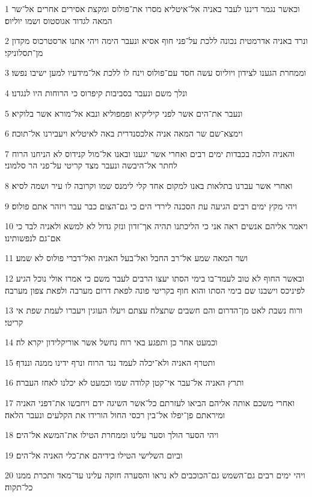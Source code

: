 \par 1 וכאשר נגמר דיננו לעבר באניה אל־איטליא מסרו את־פולוס ומקצת אסירים אחרים אל־שר המאה לגדוד אגוסטוס ושמו יוליוס׃
\par 2 ונרד באניה אדרמטית נכונה ללכת על־פני חוף אסיא ונעבר הימה ויהי אתנו ארסטרכוס מקדון מן־תסלוניקי׃
\par 3 וממחרת הגענו לצידון ויוליוס עשה חסד עם־פולוס וינח לו ללכת אל־מידעיו למען ישיבו נפשו׃
\par 4 ונלך משם ונעבר בסביבות קיפרוס כי הרוחות היו לנגדנו׃
\par 5 ונעבר את־הים אשר לפני קיליקיא ופמפוליא ונבא אל־מורא אשר בלוקיא׃
\par 6 וימצא־שם שר המאה אניה אלכסנדרית באה לאיטליא ויעבירנו אל־תוכה׃
\par 7 והאניה הלכה בכבדות ימים רבים ואחרי אשר יגענו ובאנו אל־מול קנידוס לא הניחנו הרוח לחתר אל־היבשה ונעבר מצד קריטי על־פני הר סלמוני׃
\par 8 ואחרי אשר עברנו בתלאות באנו למקום אחד קלי לימנס שמו וקרובה לו עיר ושמה לסיא׃
\par 9 ויהי מקץ ימים רבים הגיעה עת הסכנה לירדי הים כי גם־הצום כבר עבר ויזהר אתם פולוס׃
\par 10 ויאמר אליהם אנשים ראה אני כי הליכתנו תהיה אך־זדון ונזק גדול לא למשא ולאניה לבד כי אם־גם לנפשותינו׃
\par 11 ושר המאה שמע אל־רב החבל ואל־בעל האניה ואל־דברי פולוס לא שמע׃
\par 12 ובאשר החוף לא טוב לעמד־בו בימי הסתו יעצו הרבים לעבר משם כי אמרו אולי נוכל הגיע לפיניכס וישבנו שם בימי הסתו והוא חוף בקריטי פונה לפאת דרום מערבה ולפאת צפון מערבה׃
\par 13 ורוח נשבת לאט מן־הדרום והם חשבים שתצלח עצתם ויעלו העוגין ויעברו לעמת שפת אי קריטי׃
\par 14 וכמעט אחר כן ותפגע באי רוח נחשל אשר אוריקלידון יקרא לה׃
\par 15 ותטרף האניה ולא־יכלה לעמד נגד הרוח ונרף ידינו ממנה וננדף׃
\par 16 ותרץ האניה אל־עבר אי־קטן קלודה שמו וכמעט לא יכלנו לאחז העברה׃
\par 17 ואחרי משכם אותה אליהם הביאו לעזרתם כל־אשר השיגה ידם ויחבשו את־דפני האניה ומיראתם פן־יפלו אל־בין רכסי החול הורידו את הקלעים ונעבר הלאה׃
\par 18 ויהי הסער הולך וסער עלינו וממחרת הטילו את־המשא אל־הים׃
\par 19 וביום השלישי הטילו בידיהם את־כלי האניה אל־הים׃
\par 20 ויהי ימים רבים גם־השמש גם־הכוכבים לא נראו והסערה חזקה עלינו עד־מאד ותכרת ממנו כל־תקוה׃
